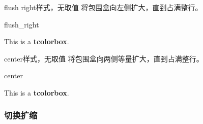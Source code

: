 \begin{docTcbKey}[][doc new=2015-11-20]{flush right}{}{样式，无取值}
  将包围盒向左侧扩大，直到占满整行。
\begin{exdispExample}{flush_right}

\begin{tcolorbox}[flush right,width=5cm,enhanced,show bounding box]
This is a \textbf{tcolorbox}.
\end{tcolorbox}
\end{exdispExample}
\end{docTcbKey}


\begin{docTcbKey}[][doc new=2015-11-20]{center}{}{样式，无取值}
  将包围盒向两侧等量扩大，直到占满整行。
\begin{exdispExample}{center}

\begin{tcolorbox}[center,width=5cm,enhanced,show bounding box]
This is a \textbf{tcolorbox}.
\end{tcolorbox}
\end{exdispExample}
\end{docTcbKey}


\clearpage
\subsubsection{切换扩缩}

